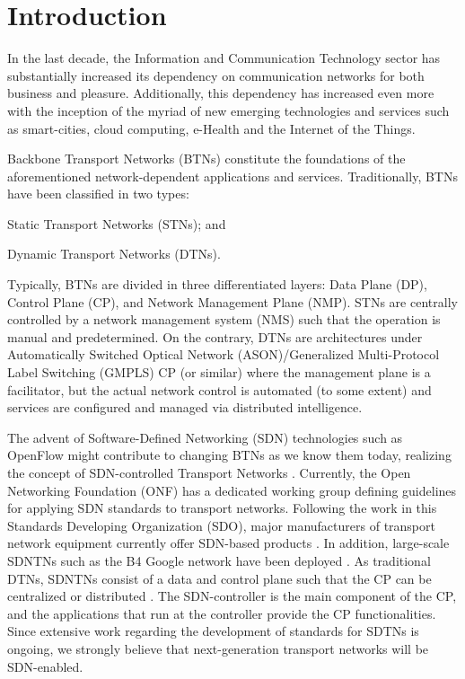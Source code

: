 \documentclass[10pt,draftclsnofoot,onecolumn,journal]{IEEEtran}
\begin{document}
\section{Introduction\label{sec:introduction}}
In the last decade, the Information and Communication Technology sector has substantially increased its dependency on communication networks for both business and pleasure. Additionally, this dependency has increased even more with the inception of the myriad of new emerging technologies and services such as smart-cities, cloud computing, e-Health and the Internet of the Things. 

Backbone Transport Networks (BTNs) constitute the foundations of the aforementioned network-dependent applications and services. Traditionally, BTNs have been classified in two types:
\begin{inparaenum}[(a)]
	\item Static Transport Networks (STNs); and
	\item Dynamic Transport Networks (DTNs).
\end{inparaenum} 
Typically, BTNs are divided in three differentiated layers: Data Plane (DP), Control Plane (CP), and Network Management Plane (NMP). STNs are centrally controlled by a network management system (NMS) such that the operation is manual and predetermined. On the contrary, DTNs are architectures under Automatically Switched Optical Network (ASON)/Generalized Multi-Protocol Label Switching (GMPLS) CP (or similar) where the management plane is a facilitator, but the actual network control is automated (to some extent) and services are configured and managed via distributed intelligence. 

The advent of Software-Defined Networking (SDN) technologies such as OpenFlow might contribute to changing BTNs as we know them today, realizing the concept of SDN-controlled Transport Networks \cite{McKeown2008Openflow,mcdysan2013SDTNS}. Currently, the Open Networking Foundation (ONF) has a dedicated working group defining guidelines for applying SDN standards to transport networks. Following the work in this Standards Developing Organization (SDO), major manufacturers of transport network equipment currently offer SDN-based products \cite{infinera2013ots}. In addition, large-scale SDNTNs such as the B4 Google network have been deployed \cite{googleB4}. As traditional DTNs, SDNTNs consist of a data and control plane such that the CP can be centralized or distributed \cite{Gringeri2013SDNTN,distributed2013sdtns}. The SDN-controller is the main component of the CP, and the applications that run at the controller provide the CP functionalities. Since extensive work regarding the development of standards for SDTNs is ongoing, we strongly believe that next-generation transport networks will be SDN-enabled. 
\end{document}
